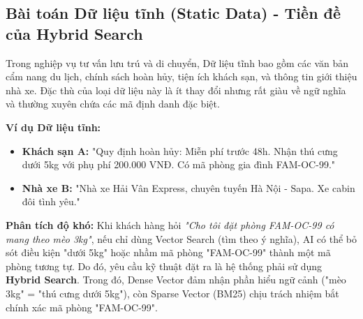 \subsection{Bài toán Dữ liệu tĩnh (Static Data) - Tiền đề của Hybrid Search}
Trong nghiệp vụ tư vấn lưu trú và di chuyển, Dữ liệu tĩnh bao gồm các văn bản cẩm nang du lịch, chính sách hoàn hủy, tiện ích khách sạn, và thông tin giới thiệu nhà xe. Đặc thù của loại dữ liệu này là ít thay đổi nhưng rất giàu về ngữ nghĩa và thường xuyên chứa các mã định danh đặc biệt.

\textbf{Ví dụ Dữ liệu tĩnh:}
\begin{itemize}
    \item \textbf{Khách sạn A:} "Quy định hoàn hủy: Miễn phí trước 48h. Nhận thú cưng dưới 5kg với phụ phí 200.000 VNĐ. Có mã phòng gia đình FAM-OC-99."
    \item \textbf{Nhà xe B:} "Nhà xe Hải Vân Express, chuyên tuyến Hà Nội - Sapa. Xe cabin đôi tình yêu."
\end{itemize}

\textbf{Phân tích độ khó:} Khi khách hàng hỏi \textit{"Cho tôi đặt phòng FAM-OC-99 có mang theo mèo 3kg"}, nếu chỉ dùng Vector Search (tìm theo ý nghĩa), AI có thể bỏ sót điều kiện "dưới 5kg" hoặc nhầm mã phòng "FAM-OC-99" thành một mã phòng tương tự. 
Do đó, yêu cầu kỹ thuật đặt ra là hệ thống phải sử dụng \textbf{Hybrid Search}. Trong đó, Dense Vector đảm nhận phần hiểu ngữ cảnh ("mèo 3kg" = "thú cưng dưới 5kg"), còn Sparse Vector (BM25) chịu trách nhiệm bắt chính xác mã phòng "FAM-OC-99".
